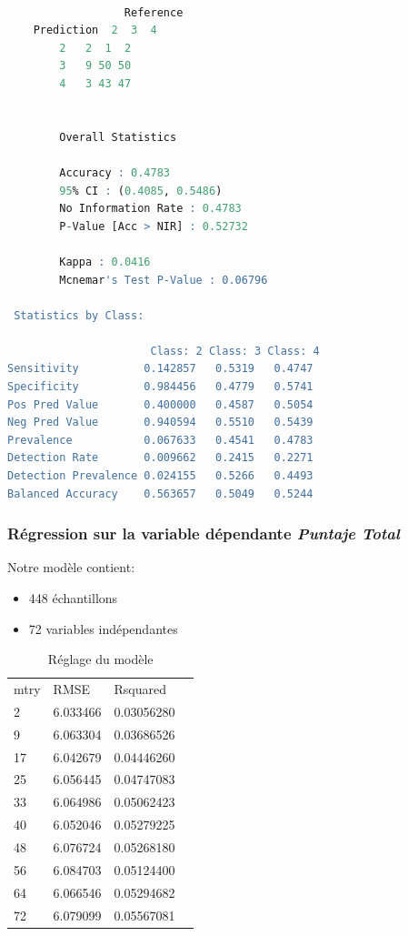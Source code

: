 \begin{minipage}{\linewidth}
	
	\begin{lstlisting}[showstringspaces=false,language=R, caption={Test du modèle de classification},captionpos=b]
		
		          Reference
	Prediction  2  3  4
		2   2  1  2
		3   9 50 50
		4   3 43 47
		
		
		Overall Statistics
		
		Accuracy : 0.4783          
		95% CI : (0.4085, 0.5486)
		No Information Rate : 0.4783          
		P-Value [Acc > NIR] : 0.52732         
		
		Kappa : 0.0416          
		Mcnemar's Test P-Value : 0.06796         
		
 Statistics by Class:
		
                      Class: 2 Class: 3 Class: 4
Sensitivity          0.142857   0.5319   0.4747
Specificity          0.984456   0.4779   0.5741
Pos Pred Value       0.400000   0.4587   0.5054
Neg Pred Value       0.940594   0.5510   0.5439
Prevalence           0.067633   0.4541   0.4783
Detection Rate       0.009662   0.2415   0.2271
Detection Prevalence 0.024155   0.5266   0.4493
Balanced Accuracy    0.563657   0.5049   0.5244
	\end{lstlisting}
\end{minipage}






\newpage
\subsubsection{Régression sur la variable dépendante \textit{Puntaje Total}}
\noindent Notre modèle contient: 
\begin{itemize}
	\item 448 échantillons
	\item 72 variables indépendantes
\end{itemize}


\begin{table}[H]
	\centering
	\caption{Réglage du modèle}
	\label{RF_Total_Resampling}
	\begin{tabular}{llll}
		mtry & RMSE     & Rsquared     \\
		2    & 6.033466 & 0.03056280   \\
		9    & 6.063304 & 0.03686526   \\
		17   & 6.042679 & 0.04446260   \\
		25   & 6.056445 & 0.04747083   \\
		33   & 6.064986 & 0.05062423   \\
		40   & 6.052046 & 0.05279225   \\
		48   & 6.076724 & 0.05268180   \\
		56   & 6.084703 & 0.05124400   \\
		64   & 6.066546 & 0.05294682   \\
		72   & 6.079099 & 0.05567081    
	\end{tabular}
\end{table}

